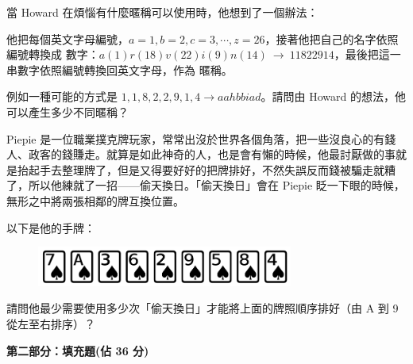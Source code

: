 \documentclass[a4paper, 12pt, addpoints]{exam}
\begin{document}
\begin{questions}
    當 Howard 在煩惱有什麼暱稱可以使⽤時，他想到了⼀個辦法：

    他把每個英⽂字⺟編號，$a = 1, b = 2, c = 3, \cdots, z = 26$，接著他把⾃⼰的名字依照編號轉換成    數字：$a(1)r(18)v(22)i(9)n(14) \ \rightarrow \ 11822914$，最後把這⼀串數字依照編號轉換回英⽂字⺟，作為
    暱稱。

    例如⼀種可能的⽅式是 $1,1,8,2,2,9,1,4 \rightarrow aahbbiad$。請問由 Howard 的想法，他可以產⽣多少不同暱稱？

    \begin{choices}
    \end{choices}

    \question[4]
    Piepie 是⼀位職業撲克牌玩家，常常出沒於世界各個⾓落，把⼀些沒良⼼的有錢⼈、政客的錢賺⾛。就算是如此神奇的⼈，也是會有懶的時候，他最討厭做的事就是抬起⼿去整理牌了，但是⼜得要好好的把牌排好，不然失誤反⽽錢被騙⾛就糟了，所以他練就了⼀招——偷天換⽇。「偷天換⽇」會在 Piepie 眨⼀下眼的時候，無形之中將兩張相鄰的牌互換位置。

    以下是他的手牌：
    \begin{figure}[H]
        \centerline{\includegraphics[width=0.75\textwidth]{fig/card.png}}
    \end{figure}


    請問他最少需要使⽤多少次「偷天換⽇」才能將上⾯的牌照順序排好（由 A 到 9 從左⾄右排序）？


    \begin{choices}
    \end{choices}
\end{questions}

\newpage
\noindent \textbf{\large 第二部分：填充題(佔 36 分)}

\noindent {}%
\end{document}
